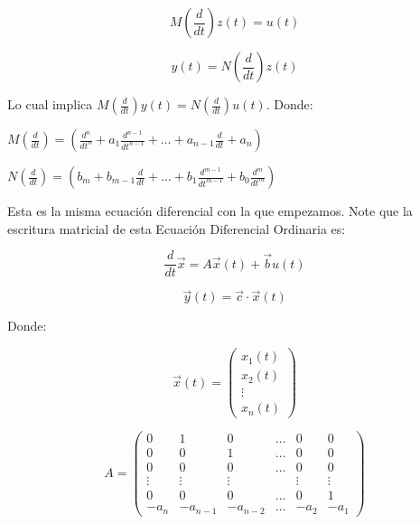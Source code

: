 \documentclass[12pt]{article}
\numberwithin{equation}{subsection}
\begin{document}
\begin{equation}
M \left( \frac{d}{dt} \right) z(t) = u(t)
\end{equation}

\begin{equation}
y(t) = N \left( \frac{d}{dt} \right) z(t)
\end{equation}

Lo cual implica $M \left( \frac{d}{dt} \right) y(t) = N \left( \frac{d}{dt} \right) u(t)$. Donde:

\begin{math}
M \left( \frac{d}{dt} \right) = \left( \frac{d^n}{dt^n} + a_1 \frac{d^{n-1}}{dt^{n-1}} + \dots + a_{n-1} \frac{d}{dt} + a_n \right)
\end{math}

\begin{math}
N \left( \frac{d}{dt} \right) = \left( b_m + b_{m-1} \frac{d}{dt} + \dots + b_1 \frac{d^{m-1}}{dt^{m-1}} + b_0 \frac{d^m}{dt^m} \right)
\end{math}

Esta es la misma ecuación diferencial con la que empezamos. Note que la escritura matricial de esta Ecuación Diferencial Ordinaria es:

\begin{equation}
\frac{d}{dt} \vec{x} = A \vec{x}(t) + \vec{b} u(t)
\end{equation}

\begin{equation}
\vec{y}(t) = \vec{c} \cdot \vec{x}(t)
\end{equation}

Donde:

\begin{equation}
\vec{x}(t) =
\begin{pmatrix}
x_1(t) \\
x_2(t) \\
\vdots \\
x_n(t) 
\end{pmatrix}
\end{equation}

\begin{equation}
A =
\begin{pmatrix}
0 & 1 & 0 & \dots & 0 & 0 \\
0 & 0 & 1 & \dots & 0 & 0 \\
0 & 0 & 0 & \dots & 0 & 0 \\
\vdots & \vdots & \vdots &   & \vdots & \vdots \\
0 & 0 & 0 & \dots & 0 & 1 \\
-a_n & -a_{n-1} & -a_{n-2} & \dots & -a_2 & -a_1 
\end{pmatrix}
\end{equation}
\end{document}
